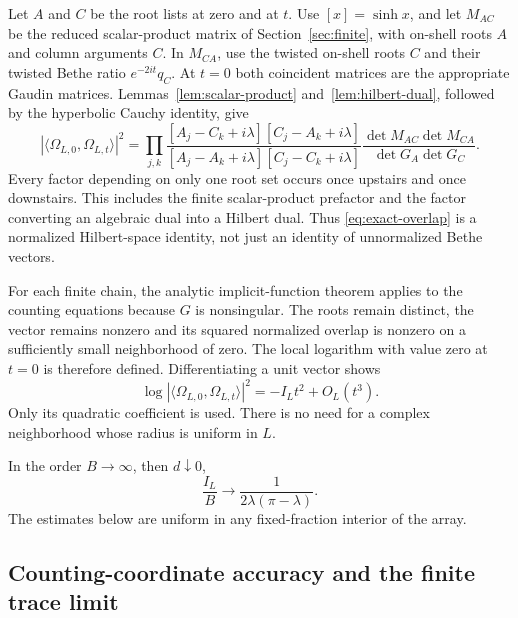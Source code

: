 Let \(A\) and \(C\) be the root lists at zero and at \(t\).
Use \([x]=\sinh x\), and let \(M_{AC}\) be the reduced scalar-product
matrix of Section~\ref{sec:finite}, with on-shell roots \(A\) and column
arguments \(C\). In \(M_{CA}\), use the twisted on-shell roots \(C\)
and their twisted Bethe ratio \(e^{-2it}q_C\). At \(t=0\) both coincident
matrices are the appropriate Gaudin matrices. Lemmas~\ref{lem:scalar-product}
and~\ref{lem:hilbert-dual}, followed by the hyperbolic Cauchy identity, give
\begin{equation}\label{eq:exact-overlap}
 |\langle\Omega_{L,0},\Omega_{L,t}\rangle|^2
 =
 \prod_{j,k}
 \frac{[A_j-C_k+i\lambda][C_j-A_k+i\lambda]}
      {[A_j-A_k+i\lambda][C_j-C_k+i\lambda]}
 \frac{\det M_{AC}\det M_{CA}}{\det G_A\det G_C}.
\end{equation}
Every factor depending on only one root set occurs once upstairs and
once downstairs. This includes the finite scalar-product prefactor and
the factor converting an algebraic dual into a Hilbert dual. Thus
\eqref{eq:exact-overlap} is a normalized Hilbert-space identity, not just
an identity of unnormalized Bethe vectors.

For each finite chain, the analytic implicit-function theorem applies
to the counting equations because \(G\) is nonsingular.
The roots remain distinct, the vector remains nonzero and its squared
normalized overlap is nonzero on a sufficiently small neighborhood of
zero. The local logarithm with value zero at \(t=0\) is therefore defined.
Differentiating a unit vector shows
\begin{equation}\label{eq:overlap-quadratic}
 \log|\langle\Omega_{L,0},\Omega_{L,t}\rangle|^2
       =-I_Lt^2+O_L(t^3).
\end{equation}
Only its quadratic coefficient is used. There is no need for a
complex neighborhood whose radius is uniform in \(L\).

\begin{lemma}\label{lem:overlap-asymptotic}
In the order \(B\to\infty\), then \(d\downarrow0\),
\begin{equation}\label{eq:overlap-density}
 \frac{I_L}{B}\longrightarrow\frac1{2\lambda(\pi-\lambda)}.
\end{equation}
The estimates below are uniform in any fixed-fraction interior of the array.
\end{lemma}

\subsection{Counting-coordinate accuracy and the finite trace limit}
\label{sec:finite-trace}

